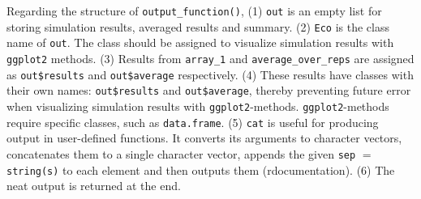 \documentclass[11pt,a4paper]{article}
\begin{document}
Regarding the structure of \texttt{output\_function()}, (1) \texttt{out}
is an empty list for storing simulation results, averaged results and
summary. (2) \texttt{Eco} is the class name of \texttt{out}. The class
should be assigned to visualize simulation results with \texttt{ggplot2}
methods. (3) Results from \texttt{array\_1} and
\texttt{average\_over\_reps} are assigned as \texttt{out\$results} and
\texttt{out\$average} respectively. (4) These results have classes with
their own names: \texttt{out\$results} and \texttt{out\$average},
thereby preventing future error when visualizing simulation results with
\texttt{ggplot2}-methods. \texttt{ggplot2}-methods require specific
classes, such as \texttt{data.frame}. (5) \texttt{cat} is useful for
producing output in user-defined functions. It converts its arguments to
character vectors, concatenates them to a single character vector,
appends the given \texttt{sep} \(=\) \texttt{string(s)} to each element
and then outputs them (rdocumentation). (6) The neat output is returned
at the end.
\end{document}
